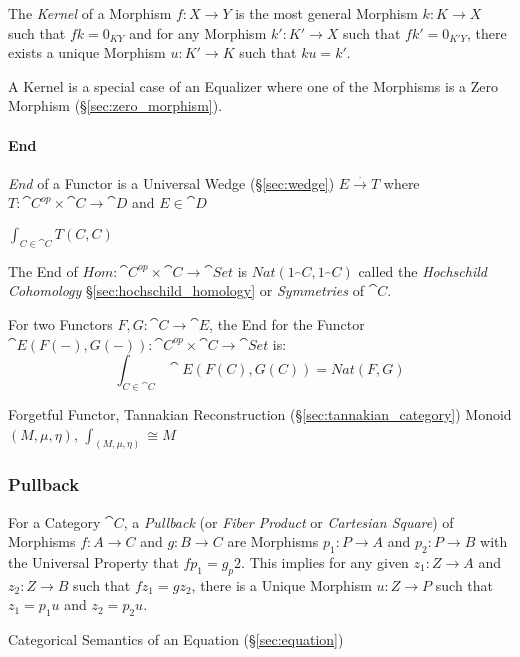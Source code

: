 The \emph{Kernel} of a Morphism $f : X \rightarrow Y$ is the most
general Morphism $k : K \rightarrow X$ such that $fk = 0_{KY}$ and for
any Morphism $k' : K' \rightarrow X$ such that $fk' = 0_{K'Y}$, there
exists a unique Morphism $u : K' \rightarrow K$ such that $ku = k'$.

A Kernel is a special case of an Equalizer where one of the Morphisms
is a Zero Morphism (\S\ref{sec:zero_morphism}).



\paragraph{End}\label{sec:end}\hfill

\emph{End} of a Functor is a Universal Wedge (\S\ref{sec:wedge}) $E
\xrightarrow{.} T$ where $T : \cat{C}^{op} \times \cat{C}
\rightarrow \cat{D}$ and $E \in \cat{D}$

$\int_{C \in \cat{C}} T(C,C)$

The End of $Hom : \cat{C}^{op} \times \cat{C} \rightarrow
\cat{Set}$ is $Nat (1_\cat{C},1_\cat{C})$ called the
\emph{Hochschild Cohomology} \S\ref{sec:hochschild_homology} or
\emph{Symmetries} of $\cat{C}$.

For two Functors $F,G : \cat{C} \rightarrow \cat{E}$, the End for
the Functor $\cat{E}(F(-), G(-)) : \cat{C}^{op} \times
\cat{C} \rightarrow \cat{Set}$ is:
\[
  \int_{C \in \cat{C}} \cat{E}(F(C), G(C)) = Nat (F,G)
\]

Forgetful Functor, Tannakian Reconstruction
(\S\ref{sec:tannakian_category}) %
Monoid $(M,\mu,\eta)$, $\int_{(M,\mu,\eta)} \cong M$



\subsubsection{Pullback}\label{sec:pullback}

For a Category $\cat{C}$, a \emph{Pullback} (or \emph{Fiber
  Product} or \emph{Cartesian Square}) of Morphisms $f : A \rightarrow
C$ and $g : B \rightarrow C$ are Morphisms $p_1 : P \rightarrow A$ and
$p_2 : P \rightarrow B$ with the Universal Property that $fp_1 =
g_p2$. This implies for any given $z_1 : Z \rightarrow A$ and $z_2 : Z
\rightarrow B$ such that $fz_1 = gz_2$, there is a Unique Morphism $u
: Z \rightarrow P$ such that $z_1 = p_1 u$ and $z_2 = p_2 u$.

Categorical Semantics of an Equation (\S\ref{sec:equation})

